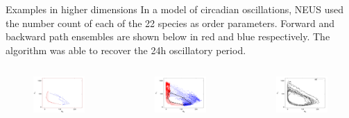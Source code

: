 \documentclass[final]{beamer}
\begin{document}
\begin{columns}[t]
\begin{column}{.33\linewidth}
\begin{block}{Examples in higher dimensions}
	      In a model of circadian oscillations, NEUS used the number count of each of the 22 species as order parameters.  Forward and backward path ensembles are shown below in red and blue respectively.  The algorithm was able to recover the 24h oscillatory period.
	      \begin{columns}[t]
		\begin{column}{.33\linewidth}
		  \begin{figure}
 		    \includegraphics[width=4 in]{images/proj1umb.pdf}
		  \end{figure}
		\end{column}
		\begin{column}{.33\linewidth}
		  \begin{figure}
 		    \includegraphics[width=4 in]{images/circpoints.pdf}
		  \end{figure}
		\end{column}
		\begin{column}{.33\linewidth}
		  \begin{figure}
 		    \includegraphics[width=4 in]{images/proj1md.pdf}

\end{figure}
\end{column}
\end{columns}
\end{block}
\end{column}
\end{columns}
\end{document}
